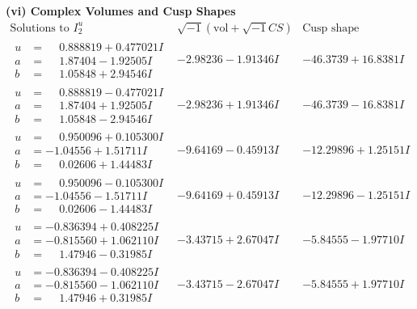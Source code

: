 \documentclass[1p]{elsarticle_modified}
\theoremstyle{definition}
\newcommand{\I}{\sqrt{-1}}
\begin{document}
\newpage\flushleft \textbf{(vi) Complex Volumes and Cusp Shapes}
$$\begin{array}{c|c|c}  
\text{Solutions to }I^u_{2}& \I (\text{vol} + \sqrt{-1}CS) & \text{Cusp shape}\\
 \hline 
\begin{aligned}
u &= \phantom{-}0.888819 + 0.477021 I \\
a &= \phantom{-}1.87404 - 1.92505 I \\
b &= \phantom{-}1.05848 + 2.94546 I\end{aligned}
 & -2.98236 - 1.91346 I & -46.3739 + 16.8381 I \\ \hline\begin{aligned}
u &= \phantom{-}0.888819 - 0.477021 I \\
a &= \phantom{-}1.87404 + 1.92505 I \\
b &= \phantom{-}1.05848 - 2.94546 I\end{aligned}
 & -2.98236 + 1.91346 I & -46.3739 - 16.8381 I \\ \hline\begin{aligned}
u &= \phantom{-}0.950096 + 0.105300 I \\
a &= -1.04556 + 1.51711 I \\
b &= \phantom{-}0.02606 + 1.44483 I\end{aligned}
 & -9.64169 - 0.45913 I & -12.29896 + 1.25151 I \\ \hline\begin{aligned}
u &= \phantom{-}0.950096 - 0.105300 I \\
a &= -1.04556 - 1.51711 I \\
b &= \phantom{-}0.02606 - 1.44483 I\end{aligned}
 & -9.64169 + 0.45913 I & -12.29896 - 1.25151 I \\ \hline\begin{aligned}
u &= -0.836394 + 0.408225 I \\
a &= -0.815560 + 1.062110 I \\
b &= \phantom{-}1.47946 - 0.31985 I\end{aligned}
 & -3.43715 + 2.67047 I & -5.84555 - 1.97710 I \\ \hline\begin{aligned}
u &= -0.836394 - 0.408225 I \\
a &= -0.815560 - 1.062110 I \\
b &= \phantom{-}1.47946 + 0.31985 I\end{aligned}
 & -3.43715 - 2.67047 I & -5.84555 + 1.97710 I \\ \hline\begin{aligned}

\end{aligned}
\end{array}$$
\end{document}

